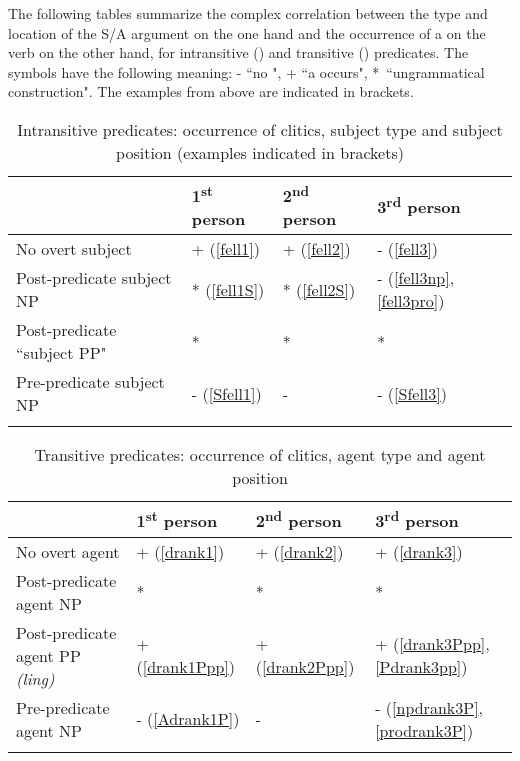 \documentclass[output=paper
,modfonts
,nonflat]{langsci/langscibook}
\begin{document}
\z

\z

\noindent The following tables summarize the complex correlation between the type and location of the S/A argument on the one hand and the occurrence of a  on the verb on the other hand, for intransitive () and transitive () predicates. The symbols have the following meaning: - ``no ", + ``a  occurs", *~``ungrammatical construction". The examples from above are indicated in brackets.

\begin{table}
	\caption{Intransitive predicates: occurrence of clitics, subject type and subject position (examples indicated in brackets)}
	\label{tab:intransitive}
	\begin{tabularx}{\textwidth}{Xlll} 
		\lsptoprule
		& 1\textsuperscript{st} person & 2\textsuperscript{nd} person & 3\textsuperscript{rd} person \\ 
		\midrule
		No overt subject    & + (\ref{fell1}) &+ (\ref{fell2}) & - (\ref{fell3}) \\
		Post-predicate subject NP   & * (\ref{fell1S}) & * (\ref{fell2S}) & - (\ref{fell3np}, \ref{fell3pro})\\
		Post-predicate ``subject PP" & * & * & * \\
		Pre-predicate subject NP    & - (\ref{Sfell1}) & - & - (\ref{Sfell3})\\
		\lspbottomrule
	\end{tabularx}
\end{table}

\begin{table}
	\caption{Transitive predicates: occurrence of clitics, agent type and agent position}
	\label{tab:transitive}
	\begin{tabularx}{\textwidth}{Xlll} 
		\lsptoprule
		& 1\textsuperscript{st} person & 2\textsuperscript{nd} person & 3\textsuperscript{rd} person \\ 
		\midrule
		No overt agent   & + (\ref{drank1}) & + (\ref{drank2}) & + (\ref{drank3}) \\
		Post-predicate agent NP   & * & *  & * \\
		Post-predicate agent PP \textit{(ling)} & + (\ref{drank1Ppp}) & + (\ref{drank2Ppp})& + (\ref{drank3Ppp}, \ref{Pdrank3pp}) \\
		Pre-predicate agent NP    & - (\ref{Adrank1P}) & - & - (\ref{npdrank3P}, \ref{prodrank3P})\\
		\lspbottomrule
	\end{tabularx}
\end{table}
\end{document}
